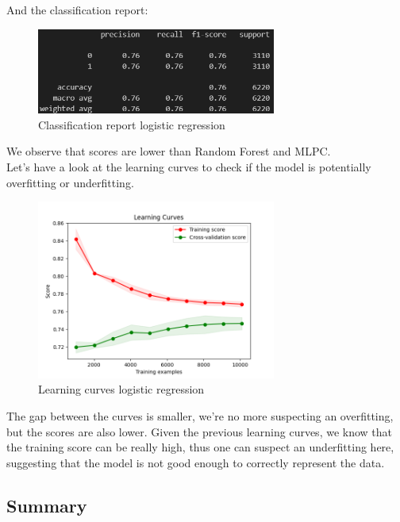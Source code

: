 \documentclass[a4paper,12pt]{article}
\begin{document}
And the classification report:
\begin{figure}[H]
  \centering
  \includegraphics[width=0.7\textwidth]{./images/report_logistic.png}
  \caption{Classification report logistic regression}
  \label{fig:report_logistic}
\end{figure}

We observe that scores are lower than Random Forest and MLPC.\\

Let's have a look at the learning curves to check if the model is potentially overfitting or underfitting.
\begin{figure}[H]
  \centering
  \includegraphics[width=0.7\textwidth]{./images/learning_curves_logistic.png}
  \caption{Learning curves logistic regression}
  \label{fig:lc_logistic}
\end{figure}

The gap between the curves is smaller, we're no more suspecting an overfitting, but the scores are also lower. Given the previous learning curves, we know that the training score can be really high, thus one can suspect an underfitting here, suggesting that the model is not good enough to correctly represent the data.\\






\subsection{Summary}
\end{document}
